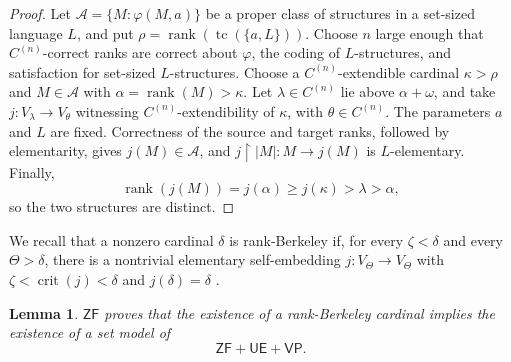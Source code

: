 \documentclass[11pt,a4paper]{amsart}
\newcommand{\VP}{\mathsf{VP}}
\newcommand{\ZF}{\mathsf{ZF}}
\newcommand{\tc}{\operatorname{tc}}
\newcommand{\rank}{\operatorname{rank}}
\newcommand{\restr}{\mathbin{\upharpoonright}}
\newcommand{\crit}{\operatorname{crit}}
\newcommand{\UE}{\mathsf{UE}}
\theoremstyle{plain}
\newtheorem{lemma}[theorem]{Lemma}
\theoremstyle{definition}
\theoremstyle{remark}
\begin{document}
\begin{proof}
 Let $\mathcal A=\{M:\varphi(M,a)\}$ be a proper class of structures in a set-sized language $L$, and put $\rho=\rank(\tc(\{a,L\}))$.  Choose $n$ large enough that $C^{(n)}$-correct ranks are correct about $\varphi$, the coding of $L$-structures, and satisfaction for set-sized $L$-structures.  Choose a $C^{(n)}$-extendible cardinal $\kappa>\rho$ and $M\in\mathcal A$ with $\alpha=\rank(M)>\kappa$.  Let $\lambda\in C^{(n)}$ lie above $\alpha+\omega$, and take $j:V_\lambda\longrightarrow V_\theta$ witnessing $C^{(n)}$-extendibility of $\kappa$, with $\theta\in C^{(n)}$.  The parameters $a$ and $L$ are fixed.  Correctness of the source and target ranks, followed by elementarity, gives $j(M)\in\mathcal A$, and $j\restr|M|:M\to j(M)$ is $L$-elementary.  Finally,
\[
\rank(j(M))=j(\alpha)\geq j(\kappa)>\lambda>\alpha,
\]
so the two structures are distinct.
\end{proof}

{\color{auditgreen}We recall that a nonzero cardinal $\delta$ is rank-Berkeley} if, for every $\zeta<\delta$ and every $\Theta>\delta$, there is a nontrivial elementary self-embedding $j:V_\Theta\to V_\Theta$ with $\zeta<\crit(j)<\delta$ and $j(\delta)=\delta$ \cite[Definition~4.4]{Mohammd}.

\begin{lemma}\label{lem:rank-Berkeley-descent}
$\ZF$ proves that the existence of a rank-Berkeley cardinal implies the existence of a set model of
\[
\ZF+\UE+\VP.
\]
\end{lemma}
\end{document}
